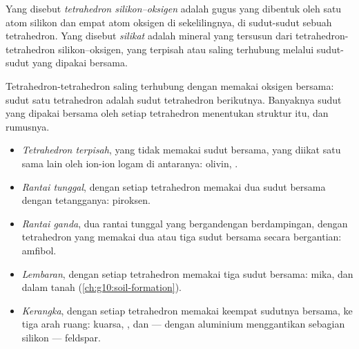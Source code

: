 \begin{definition}\label{def:g11:minerals:silicate}
Yang disebut \emph{tetrahedron silikon--oksigen}
adalah gugus  yang dibentuk oleh satu atom silikon dan empat atom
oksigen di sekelilingnya, di sudut-sudut sebuah tetrahedron. Yang disebut
\emph{silikat} adalah mineral yang tersusun dari
tetrahedron-tetrahedron silikon--oksigen, yang terpisah atau saling terhubung
melalui sudut-sudut yang dipakai bersama.
\end{definition}

Tetrahedron-tetrahedron saling terhubung dengan memakai oksigen bersama: sudut
satu tetrahedron adalah sudut tetrahedron berikutnya. Banyaknya sudut yang dipakai
bersama oleh setiap tetrahedron menentukan struktur  itu, dan rumusnya.
\begin{itemize}
  \item \emph{Tetrahedron terpisah}, yang tidak memakai sudut bersama, yang
        diikat satu sama lain oleh ion-ion logam di antaranya: olivin,
        .
  \item \emph{Rantai tunggal}, dengan setiap tetrahedron memakai dua sudut
        bersama dengan tetangganya: piroksen.
  \item \emph{Rantai ganda}, dua rantai tunggal yang bergandengan
        berdampingan, dengan tetrahedron yang memakai dua atau tiga sudut
        bersama secara bergantian: amfibol.
  \item \emph{Lembaran}, dengan setiap tetrahedron memakai tiga sudut bersama:
        mika, dan  dalam tanah
        (\cref{ch:g10:soil-formation}).
  \item \emph{Kerangka}, dengan setiap tetrahedron memakai keempat sudutnya
        bersama, ke tiga arah ruang: kuarsa, , dan --- dengan aluminium
        menggantikan sebagian silikon --- feldspar.
\end{itemize}


